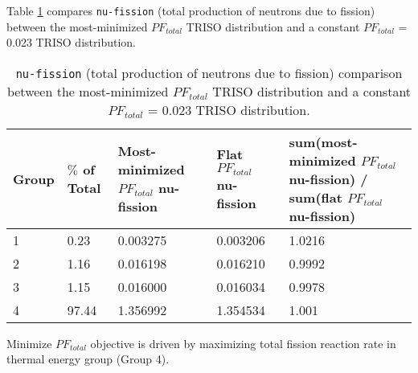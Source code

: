 Table \ref{tab:0.023-plank-nu-fission-rate} compares \texttt{nu-fission} (total 
production of neutrons due to fission) between the most-minimized $PF_{total}$ TRISO 
distribution and a constant $PF_{total}$ = 0.023 TRISO distribution.
\begin{table}[H]
    \centering
    \onehalfspacing
    \caption{\texttt{nu-fission} (total production of neutrons due to fission) comparison 
    between the most-minimized $PF_{total}$ TRISO distribution and a constant 
    $PF_{total}$ = 0.023 TRISO distribution.}
	\label{tab:0.023-plank-nu-fission-rate}
    \footnotesize
    \begin{tabular}{llp{4cm}p{4cm}p{5cm}}
    \hline
    \textbf{Group} & 
    \textbf{$\%$ of Total} &
    \textbf{Most-minimized $PF_{total}$ nu-fission} & 
    \textbf{Flat $PF_{total}$ nu-fission} & 
    \textbf{sum(most-minimized $PF_{total}$ nu-fission) / sum(flat $PF_{total}$ nu-fission)}\\
    \hline 
    1 & 0.23 & 0.003275 & 0.003206 & 1.0216 \\
    2 & 1.16 & 0.016198 & 0.016210 & 0.9992 \\
    3 & 1.15 & 0.016000 & 0.016034 & 0.9978 \\
    4 & 97.44& 1.356992 & 1.354534 & 1.001 \\
    \hline
    \end{tabular}
\end{table}

Minimize $PF_{total}$ objective is driven by maximizing total fission reaction rate in 
thermal energy group (Group 4). 